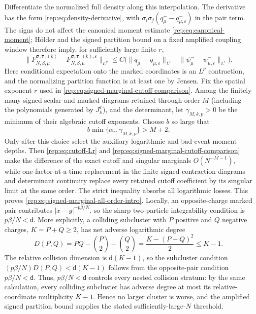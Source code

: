 \documentclass[11pt,reqno]{amsart}
\numberwithin{equation}{section}
\theoremstyle{plain}
\theoremstyle{definition}
\renewcommand{\d}{\mathsf d}
\newcommand{\be}{\beta}
\newcommand{\vep}{\varepsilon}
\begin{document}
Differentiate the normalized full density along this interpolation.  The derivative has the form \eqref{rep:eq:density-derivative}, with
$\sigma_i\sigma_j(q^-_\mu-q^-_{\mu,\vep})$ in the pair term.  The signs do not affect the canonical moment estimate \eqref{rep:eq:canonical-moment}; H\"older and the signed partition bound on a fixed amplified coupling window therefore imply, for sufficiently large finite $r$,
\begin{equation}\label{rep:eq:signed-marginal-cutoff-comparison}
 \|F_{N,\be,\mu}^{\boldsymbol\sigma,\boldsymbol\tau,(k)}
 -F_{N,\be,\mu}^{\boldsymbol\sigma,\boldsymbol\tau,(k),\vep}\|_{L^p}
 \le C\bigl(\|q^-_\mu-q^-_{\mu,\vep}\|_{L^r}
 +\|\psi^-_\mu-\psi^-_{\mu,\vep}\|_{L^r}\bigr).
\end{equation}
Here conditional expectation onto the marked coordinates is an $L^p$ contraction, and the normalizing partition function is at least one by Jensen.  Fix the spatial exponent $r$ used in
\eqref{rep:eq:signed-marginal-cutoff-comparison}.  Among the finitely many signed
scalar and marked diagrams retained through order $M$ (including the
polynomials generated by $J_k^{\boldsymbol\tau}$), and the determinant, let
$\gamma_{M,k,p}>0$ be the minimum of their algebraic cutoff exponents.  Choose
$b$ so large that
\begin{equation}
 b\min\{\alpha_r,\gamma_{M,k,p}\}>M+2.
\end{equation}
Only after this choice select the auxiliary logarithmic and bad-event moment
depths.  Then \eqref{rep:eq:cutoff-Lr} and
\eqref{rep:eq:signed-marginal-cutoff-comparison} make the difference of the exact
cutoff and singular marginals $O(N^{-M-1})$, while one-factor-at-a-time
replacement in the finite signed contraction diagrams and determinant
continuity replace every retained cutoff coefficient by its singular limit at
the same order.  The strict inequality absorbs all logarithmic losses.  This proves \eqref{rep:eq:signed-marginal-all-order-intro}.  Locally, an opposite-charge marked pair contributes $|x-y|^{-p\be/N}$, so the sharp two-particle integrability condition is $p\be/N<\d$.  More explicitly, a colliding subcluster with $P$ positive and $Q$ negative charges, $K=P+Q\ge2$, has net adverse logarithmic degree
\begin{equation}\label{rep:eq:collision-cluster-degree}
 D(P,Q)=PQ-\binom P2-\binom Q2
 =\frac{K-(P-Q)^2}{2}\le K-1.
\end{equation}
The relative collision dimension is $\d(K-1)$, so the subcluster condition
$(p\be/N)D(P,Q)<\d(K-1)$ follows from the opposite-pair condition $p\be/N<\d$.  Thus, $p\be/N<\d$ controls every nested collision stratum: by the same calculation, every colliding subcluster has adverse degree at most its relative-coordinate multiplicity $K-1$.  Hence no larger cluster is worse, and the amplified signed partition bound supplies the stated sufficiently-large-$N$ threshold.
\end{document}
